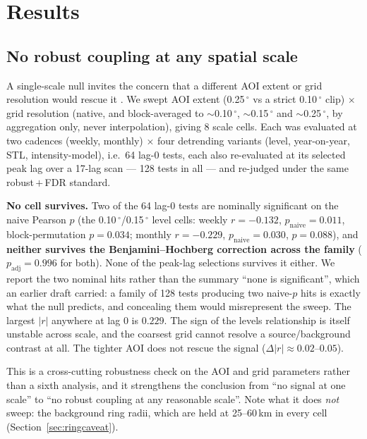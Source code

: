 \documentclass[11pt,a4paper]{article}
\providecommand{\degree}{\ensuremath{^{\circ}}}
\newcommand{\rval}[1]{\mbox{$r=#1$}}
\begin{document}
\section{Results}
\label{sec:results}

\subsection{No robust coupling at any spatial scale}
\label{sec:scale}

A single-scale null invites the concern that a different AOI extent or grid resolution would
rescue it \citep{parubets_naito_2025}. We swept AOI extent (0.25\,\degree{} vs a strict
0.10\,\degree{} clip) $\times$ grid resolution (native, and block-averaged to
$\sim$0.10\,\degree, $\sim$0.15\,\degree{} and $\sim$0.25\,\degree, by aggregation only, never
interpolation), giving 8 scale cells. Each was evaluated at two cadences (weekly, monthly)
$\times$ four detrending variants (level, year-on-year, STL, intensity-model), i.e.\ 64 lag-0
tests, each also re-evaluated at its selected peak lag over a 17-lag scan --- 128 tests in all ---
and re-judged under the same robust\,$+$\,FDR standard.

\textbf{No cell survives.} Two of the 64 lag-0 tests are nominally significant on the naive
Pearson $p$ (the 0.10\,\degree/0.15\,\degree{} level cells: weekly \rval{-0.132},
$p_{\text{naive}}=0.011$, block-permutation $p=0.034$; monthly \rval{-0.229},
$p_{\text{naive}}=0.030$, $p=0.088$), and \textbf{neither survives the Benjamini--Hochberg
correction across the family} ($p_{\text{adj}}=0.996$ for both). None of the peak-lag selections
survives it either. We report the two nominal hits rather than the summary ``none is significant'',
which an earlier draft carried: a family of 128 tests producing two naive-$p$ hits is exactly what
the null predicts, and concealing them would misrepresent the sweep. The largest $|r|$ anywhere at
lag 0 is $0.229$. The sign of the levels relationship is itself unstable across scale, and the
coarsest grid cannot resolve a source/background contrast at all. The tighter AOI does not rescue
the signal ($\Delta|r|\approx0.02$--$0.05$).

This is a cross-cutting robustness check on the AOI and grid parameters rather than a sixth
analysis, and it strengthens the conclusion from ``no signal at one scale'' to ``no robust
coupling at any reasonable scale''. Note what it does \emph{not} sweep: the background ring radii,
which are held at 25--60\,km in every cell (Section~\ref{sec:ringcaveat}).
\end{document}
